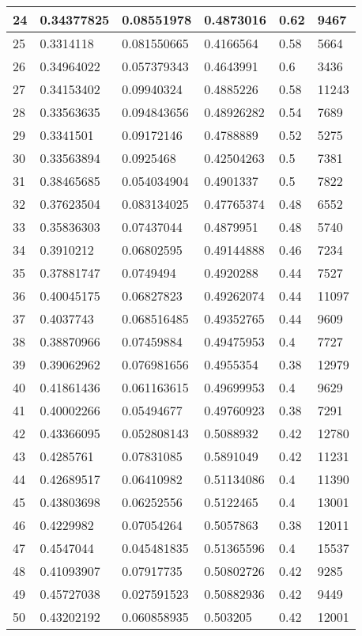 \begin{longtable}{|l|l|l|l|l|l|}
24 & 0.34377825 & 0.08551978 & 0.4873016 & 0.62 & 9467 \\ \hline 
25 & 0.3314118 & 0.081550665 & 0.4166564 & 0.58 & 5664 \\ \hline 
26 & 0.34964022 & 0.057379343 & 0.4643991 & 0.6 & 3436 \\ \hline 
27 & 0.34153402 & 0.09940324 & 0.4885226 & 0.58 & 11243 \\ \hline 
28 & 0.33563635 & 0.094843656 & 0.48926282 & 0.54 & 7689 \\ \hline 
29 & 0.3341501 & 0.09172146 & 0.4788889 & 0.52 & 5275 \\ \hline 
30 & 0.33563894 & 0.0925468 & 0.42504263 & 0.5 & 7381 \\ \hline 
31 & 0.38465685 & 0.054034904 & 0.4901337 & 0.5 & 7822 \\ \hline 
32 & 0.37623504 & 0.083134025 & 0.47765374 & 0.48 & 6552 \\ \hline 
33 & 0.35836303 & 0.07437044 & 0.4879951 & 0.48 & 5740 \\ \hline 
34 & 0.3910212 & 0.06802595 & 0.49144888 & 0.46 & 7234 \\ \hline 
35 & 0.37881747 & 0.0749494 & 0.4920288 & 0.44 & 7527 \\ \hline 
36 & 0.40045175 & 0.06827823 & 0.49262074 & 0.44 & 11097 \\ \hline 
37 & 0.4037743 & 0.068516485 & 0.49352765 & 0.44 & 9609 \\ \hline 
38 & 0.38870966 & 0.07459884 & 0.49475953 & 0.4 & 7727 \\ \hline 
39 & 0.39062962 & 0.076981656 & 0.4955354 & 0.38 & 12979 \\ \hline 
40 & 0.41861436 & 0.061163615 & 0.49699953 & 0.4 & 9629 \\ \hline 
41 & 0.40002266 & 0.05494677 & 0.49760923 & 0.38 & 7291 \\ \hline 
42 & 0.43366095 & 0.052808143 & 0.5088932 & 0.42 & 12780 \\ \hline 
43 & 0.4285761 & 0.07831085 & 0.5891049 & 0.42 & 11231 \\ \hline 
44 & 0.42689517 & 0.06410982 & 0.51134086 & 0.4 & 11390 \\ \hline 
45 & 0.43803698 & 0.06252556 & 0.5122465 & 0.4 & 13001 \\ \hline 
46 & 0.4229982 & 0.07054264 & 0.5057863 & 0.38 & 12011 \\ \hline 
47 & 0.4547044 & 0.045481835 & 0.51365596 & 0.4 & 15537 \\ \hline 
48 & 0.41093907 & 0.07917735 & 0.50802726 & 0.42 & 9285 \\ \hline 
49 & 0.45727038 & 0.027591523 & 0.50882936 & 0.42 & 9449 \\ \hline 
50 & 0.43202192 & 0.060858935 & 0.503205 & 0.42 & 12001 \\ \hline 
\end{longtable}